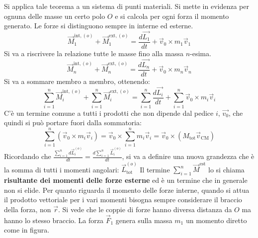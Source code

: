 \documentclass[10pt,a4paper]{book}
\begin{document}
\begin{figure}[htpb]
\end{figure}
\FloatBarrier
Si applica tale teorema a un sistema di punti materiali. Si mette in evidenza per ognuna delle masse un certo polo $O$ e si calcola per ogni forza il momento generato. Le forze si distinguono sempre in interne ed esterne.
\[
	\vec{M}_1^{\text{int}, (o)}+\vec{M}_1^{\text{ext}, (o)}=\frac{d\vec{L_1}}{dt}+\vec{v}_0\times m_1\vec{v}_1
\]
Si va a riscrivere la relazione tutte le masse fino alla massa $n$-esima.
\[
	\vec{M}_n^{\text{int}, (o)}+\vec{M}_n^{\text{ext}, (o)}=\frac{d\vec{L_n}}{dt}+\vec{v}_0\times m_n\vec{v}_n
\]
Si va a sommare membro a membro, ottenendo:
\[
	\sum_{i=1}^n \vec{M}_i^{\text{int}, (o)}+\sum_{i=1}^n \vec{M}_i^{\text{ext}, (o)}=\sum_{i=1}^n \frac{d\vec{L_i}}{dt}+\sum_{i=1}^n \vec{v}_0\times m_i\vec{v}_i
\]
C'è un termine comune a tutti i prodotti che non dipende dal pedice $i$, $\vec{v_0}$, che quindi si può portare fuori dalla sommatoria:
\begin{equation}
	\label{ciao}
	\sum_{i=1}^n(\vec{v}_0\times m_i\vec{v}_i)=\vec{v}_0 \times \sum_{i=1}^nm_i\vec{v}_i=\vec{v}_0\times (M_\text{tot}\vec{v}_\text{CM})
\end{equation}
Ricordando che $\frac{\sum_{i=1}^nd\vec{L}_i^{(o)}}{dt}=\frac{d\sum_{i=1}^n \vec{L}_i^{(o)}}{dt}$, si va a definire una nuova grandezza che è la somma di tutti i momenti angolari: $\vec{L}_\text{tot}^{(o)}$
Il termine $\sum_{i=1}^n \vec{M}^\text{est}$ lo si chiama \textbf{risultante dei momenti delle forze esterne} ed è un termine che in generale non si elide. Per quanto riguarda il momento delle forze interne, quando si attua il prodotto vettoriale per i vari momenti bisogna sempre considerare il braccio della forza, non $\vec{r}$. Si vede che le coppie di forze hanno diversa distanza da $O$ ma hanno lo stesso braccio. La forza $\vec{F}_1$ genera sulla massa $m_1$ un momento diretto come in figura.
\end{document}
